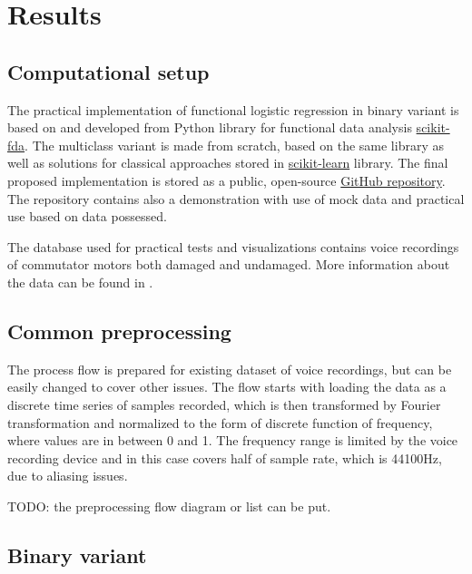 \documentclass[energies,article,submit,pdftex,moreauthors]{Definitions/mdpi}
\begin{document}
\section{Results}

\subsection{Computational setup}

The practical implementation of functional logistic regression in binary variant is based on and developed from Python library for functional data analysis \href{https://fda.readthedocs.io/en/latest/index.html}{scikit-fda}. The multiclass variant is made from scratch, based on the same library as well as solutions for classical approaches stored in \href{https://scikit-learn.org/}{scikit-learn} library. The final proposed implementation is stored as a public, open-source \href{https://github.com/Porbi96/fda-time-series-classification}{GitHub repository}. The repository contains also a demonstration with use of mock data and practical use based on data possessed.

The database used for practical tests and visualizations contains voice recordings of commutator motors both damaged and undamaged. More information about the data can be found in \cite{ref-motors}.


\subsection{Common preprocessing}

The process flow is prepared for existing dataset of voice recordings, but can be easily changed to cover other issues. The flow starts with loading the data as a discrete time series of samples recorded, which is then transformed by Fourier transformation and normalized to the form of discrete function of frequency, where values are in between 0 and 1. The frequency range is limited by the voice recording device and in this case covers half of sample rate, which is 44100Hz, due to aliasing issues.

\vspace{5mm}
TODO: the preprocessing flow diagram or list can be put.
\vspace{5mm}

\subsection{Binary variant}
\end{document}
